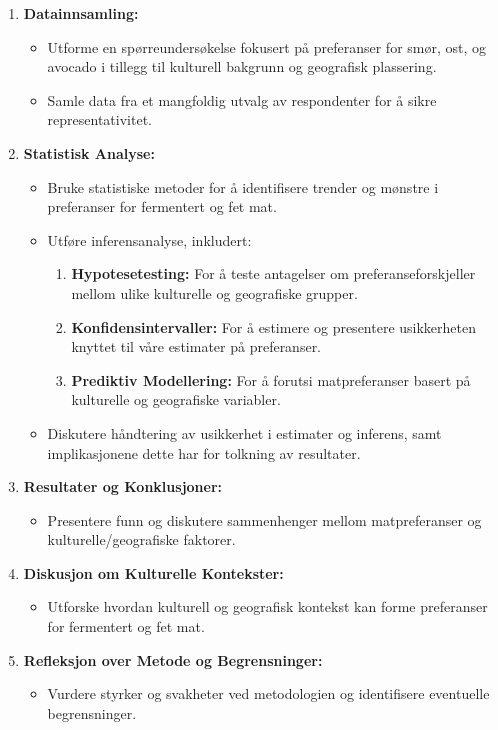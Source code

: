 \documentclass{article}
\begin{document}
\begin{enumerate}[label=\arabic*.]
  \item \textbf{Datainnsamling:}
  \begin{itemize}
    \item Utforme en spørreundersøkelse fokusert på preferanser for smør, ost, og avocado i tillegg til kulturell bakgrunn og geografisk plassering.
    \item Samle data fra et mangfoldig utvalg av respondenter for å sikre representativitet.
  \end{itemize}
  
  \item \textbf{Statistisk Analyse:}
  \begin{itemize}
    \item Bruke statistiske metoder for å identifisere trender og mønstre i preferanser for fermentert og fet mat.
    \item Utføre inferensanalyse, inkludert:
      \begin{enumerate}
        \item \textbf{Hypotesetesting:} For å teste antagelser om preferanseforskjeller mellom ulike kulturelle og geografiske grupper.
        \item \textbf{Konfidensintervaller:} For å estimere og presentere usikkerheten knyttet til våre estimater på preferanser.
        \item \textbf{Prediktiv Modellering:} For å forutsi matpreferanser basert på kulturelle og geografiske variabler.
      \end{enumerate}
    \item Diskutere håndtering av usikkerhet i estimater og inferens, samt implikasjonene dette har for tolkning av resultater.
  \end{itemize}
  
  \item \textbf{Resultater og Konklusjoner:}
  \begin{itemize}
    \item Presentere funn og diskutere sammenhenger mellom matpreferanser og kulturelle/geografiske faktorer.
  \end{itemize}
  
  \item \textbf{Diskusjon om Kulturelle Kontekster:}
  \begin{itemize}
    \item Utforske hvordan kulturell og geografisk kontekst kan forme preferanser for fermentert og fet mat.
  \end{itemize}
  
  \item \textbf{Refleksjon over Metode og Begrensninger:}
  \begin{itemize}
    \item Vurdere styrker og svakheter ved metodologien og identifisere eventuelle begrensninger.
  \end{itemize}
\end{enumerate}
\end{document}
